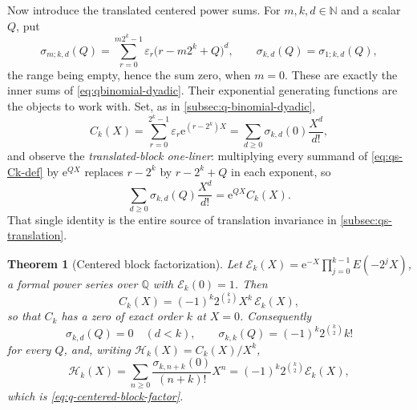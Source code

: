 \documentclass[11pt,oneside]{article}
\newtheorem{theorem}{Theorem}[section]
\theoremstyle{definition}
\theoremstyle{remark}
\newcommand{\Q}{\mathbb Q}
\newcommand{\N}{\mathbb N}
\newcommand{\e}{\mathrm e}
\begin{document}
Now introduce the translated centered power sums.  For $m,k,d\in\N$ and a scalar $Q$, put
\begin{equation}
 \sigma_{m;k,d}(Q)=\sum_{r=0}^{m2^k-1}\varepsilon_r\bigl(r-m2^k+Q\bigr)^d,
 \qquad
 \sigma_{k,d}(Q)=\sigma_{1;k,d}(Q),                        \label{eq:qs-sigma-def}
\end{equation}
the range being empty, hence the sum zero, when $m=0$.
These are exactly the inner sums of \eqref{eq:qbinomial-dyadic}.  Their exponential
generating functions are the objects to work with.  Set, as in
\cref{subsec:q-binomial-dyadic},
\begin{equation}
 C_k(X)=\sum_{r=0}^{2^k-1}\varepsilon_r\e^{(r-2^k)X}
 =\sum_{d\ge0}\sigma_{k,d}(0)\frac{X^d}{d!},               \label{eq:qs-Ck-def}
\end{equation}
and observe the \emph{translated-block one-liner}: multiplying every summand of
\eqref{eq:qs-Ck-def} by $\e^{QX}$ replaces $r-2^k$ by $r-2^k+Q$ in each exponent, so
\begin{equation}
 \sum_{d\ge0}\sigma_{k,d}(Q)\frac{X^d}{d!}=\e^{QX}C_k(X). \label{eq:qs-translated-block}
\end{equation}
That single identity is the entire source of translation invariance in
\cref{subsec:qs-translation}.

\begin{theorem}[Centered block factorization]
\label{thm:qs-block-factorization}
Let $\mathscr E_k(X)=\e^{-X}\prod_{j=0}^{k-1}E(-2^jX)$, a formal power series over $\Q$ with
$\mathscr E_k(0)=1$.  Then
\begin{equation}
 C_k(X)=(-1)^k2^{\binom k2}X^k\,\mathscr E_k(X),          \label{eq:qs-Ck-factor}
\end{equation}
so that $C_k$ has a zero of exact order $k$ at $X=0$.  Consequently
\begin{equation}
 \sigma_{k,d}(Q)=0\quad(d<k),
 \qquad
 \sigma_{k,k}(Q)=(-1)^k2^{\binom k2}k!                     \label{eq:qs-prouhet}
\end{equation}
for every $Q$, and, writing $\mathscr H_k(X)=C_k(X)/X^k$,
\begin{equation}
 \mathscr H_k(X)=\sum_{n\ge0}\frac{\sigma_{k,n+k}(0)}{(n+k)!}X^n
 =(-1)^k2^{\binom k2}\mathscr E_k(X),                      \label{eq:qs-Hk}
\end{equation}
which is \eqref{eq:q-centered-block-factor}.
\end{theorem}
\end{document}
